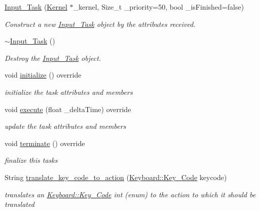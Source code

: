 \begin{DoxyCompactItemize}
\item 
\mbox{\hyperlink{classbanita_1_1_input___task_a75406b32a241df928053b9627954ad1f}{Input\+\_\+\+Task}} (\mbox{\hyperlink{classbanita_1_1_kernel}{Kernel}} $\ast$\+\_\+kernel, Size\+\_\+t \+\_\+priority=50, bool \+\_\+is\+Finished=false)
\begin{DoxyCompactList}\small\item\em Construct a new \mbox{\hyperlink{classbanita_1_1_input___task}{Input\+\_\+\+Task}} object by the attributes received. \end{DoxyCompactList}\item 
\mbox{\hyperlink{classbanita_1_1_input___task_a53bbe9a3f6505e217785e6ebb4a8e15b}{$\sim$\+Input\+\_\+\+Task}} ()
\begin{DoxyCompactList}\small\item\em Destroy the \mbox{\hyperlink{classbanita_1_1_input___task}{Input\+\_\+\+Task}} object. \end{DoxyCompactList}\item 
void \mbox{\hyperlink{classbanita_1_1_input___task_a3f7f72ab848a23a92c3351426b3595c9}{initialize}} () override
\begin{DoxyCompactList}\small\item\em initialize the task attributes and members \end{DoxyCompactList}\item 
void \mbox{\hyperlink{classbanita_1_1_input___task_a68a88772e60109b5d461b2a75f05ee35}{execute}} (float \+\_\+delta\+Time) override
\begin{DoxyCompactList}\small\item\em update the task attributes and members \end{DoxyCompactList}\item 
void \mbox{\hyperlink{classbanita_1_1_input___task_af6f524863581208331f6dd08d7e1cbb5}{terminate}} () override
\begin{DoxyCompactList}\small\item\em finalize this tasks \end{DoxyCompactList}\item 
String \mbox{\hyperlink{classbanita_1_1_input___task_a3c49cbbd067e4eb65a55393207b69bdc}{translate\+\_\+key\+\_\+code\+\_\+to\+\_\+action}} (\mbox{\hyperlink{classbanita_1_1_keyboard_a0dee214e6cb4f246866603b85568b9ab}{Keyboard\+::\+Key\+\_\+\+Code}} keycode)
\begin{DoxyCompactList}\small\item\em translates an \mbox{\hyperlink{classbanita_1_1_keyboard_a0dee214e6cb4f246866603b85568b9ab}{Keyboard\+::\+Key\+\_\+\+Code}} int (enum) to the action to which it should be translated \end{DoxyCompactList}\end{DoxyCompactItemize}
